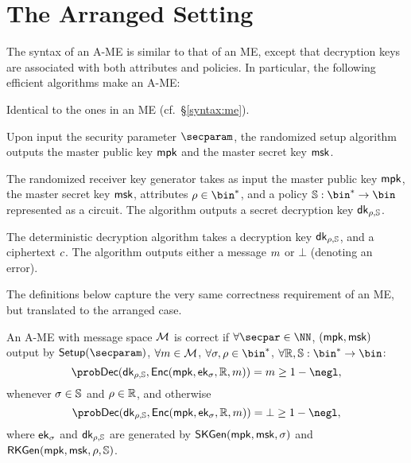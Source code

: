 \section{The Arranged Setting}
The syntax of an A-ME is similar to that of an ME, except that decryption keys are associated with both attributes and policies. In particular,
the following efficient algorithms make an A-ME:
\begin{description}\label{syntax:ame}

    \item[$\skgen,\enc$:] Identical to the ones in an ME (cf.\ \S\ref{syntax:me}).

    \item[$\setup$:] Upon input the security parameter $\secparam$, the randomized setup algorithm outputs the master public key $\mathsf{mpk}$ and the master secret key $\mathsf{msk}$.

    \item[$\rkgen(\msk, \rattr, \saccess)$:] The randomized receiver key generator takes as input the master public key $\mathsf{mpk}$, the master secret key $\mathsf{msk}$, attributes $\rattr \in \bin^*$, and a policy $\saccess:\bin^*\rightarrow\bin$ represented as a circuit. The algorithm outputs a secret decryption key $\mathsf{dk}_{\rho,\mathbb{S}}$.

    \item[$\dec(\dk_{\rattr, \saccess}, \cipher)$] The deterministic decryption algorithm takes a decryption  key $\mathsf{dk}_{\rho,\mathbb{S}}$, and a ciphertext $c$.
          The algorithm outputs either a message $m$ or $\bot$ (denoting an error).
\end{description}

The definitions below capture the very same correctness requirement of an ME, but translated to the arranged case.

\begin{definition}[Correctness of A-ME]\label{def:ame_correctness}
    An A-ME with message space $\mathcal{M}$ is correct if
    $\forall \secpar \in \NN$, $(\mathsf{mpk},\mathsf{msk})$ output by $\setup(\secparam)$, $\forall m\in \mathcal{M}$, $\forall \sattr,\rattr \in \bin^*$, $\forall \raccess,\saccess:\bin^* \rightarrow \bin$:
    \[
        \Prob{\dec(\dk_{\rattr,\saccess}, \enc(\mpk, \ek_{\sattr}, \raccess, \msg)) = \msg} \geq 1 - \negl,
    \]
    whenever $\sigma \in \mathbb{S}$ and $\rho \in \mathbb{R}$, and otherwise
    \[
        \Prob{\dec(\dk_{\rattr,\saccess}, \enc(\mpk, \ek_{\sattr}, \raccess, \msg)) = \bot} \geq 1 - \negl,
    \]
    where $\mathsf{ek}_{\sigma}$ and $\mathsf{dk}_{\rho,\mathbb{S}}$ are generated by $\mathsf{SKGen}(\mathsf{mpk}, \mathsf{msk}, \sigma)$ and $\mathsf{RKGen}(\mathsf{mpk}, \mathsf{msk}, \rho, \allowbreak\mathbb{S})$.
\end{definition}
